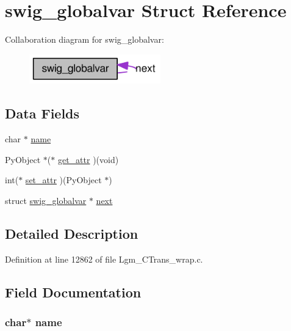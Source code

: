 \hypertarget{structswig__globalvar}{
\section{swig\_\-globalvar Struct Reference}
\label{structswig__globalvar}
}
Collaboration diagram for swig\_\-globalvar:\nopagebreak
\begin{figure}[H]
\begin{center}
\leavevmode
\includegraphics[width=161pt]{structswig__globalvar__coll__graph}
\end{center}
\end{figure}
\subsection*{Data Fields}
\begin{CompactItemize}
\item 
char $\ast$ \hyperlink{structswig__globalvar_5ac083a645d964373f022d03df4849c8}{name}
\item 
PyObject $\ast$($\ast$ \hyperlink{structswig__globalvar_0879d4d584d1ffda2ef5f917dc5a6f0a}{get\_\-attr} )(void)
\item 
int($\ast$ \hyperlink{structswig__globalvar_a452f906a54c91621799831e4280478f}{set\_\-attr} )(PyObject $\ast$)
\item 
struct \hyperlink{structswig__globalvar}{swig\_\-globalvar} $\ast$ \hyperlink{structswig__globalvar_caa8d5ee0bdeaf2c6975b8751dc580fa}{next}
\end{CompactItemize}


\subsection{Detailed Description}


Definition at line 12862 of file Lgm\_\-CTrans\_\-wrap.c.

\subsection{Field Documentation}
\hypertarget{structswig__globalvar_5ac083a645d964373f022d03df4849c8}{
\subsubsection[{name}]{\setlength{\rightskip}{0pt plus 5cm}char$\ast$ {\bf name}}}
\label{structswig__globalvar_5ac083a645d964373f022d03df4849c8}




